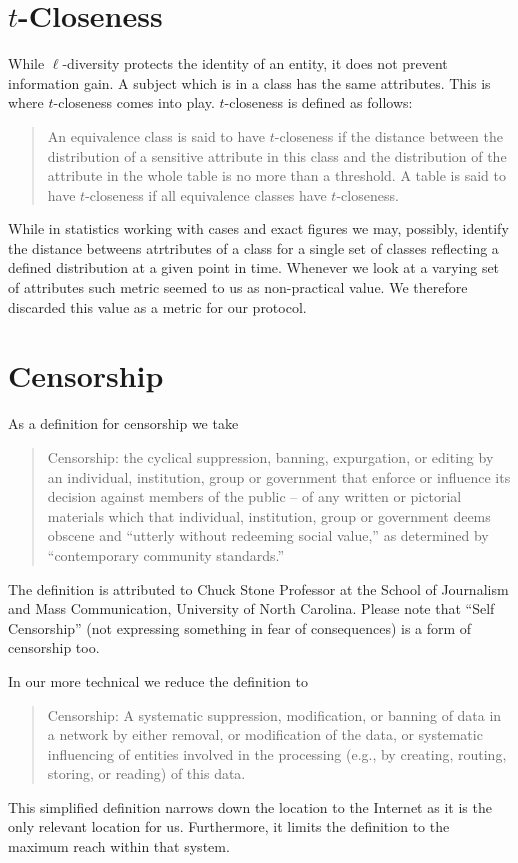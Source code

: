 \section{\texorpdfstring{$t$}{t}-Closeness}
While $\ell$-diversity protects the identity of an entity, it does not prevent information gain. A subject which is in a class has the same attributes. This is where $t$-closeness\cite{li2007t} comes into play. $t$-closeness is defined as follows:

\begin{quote}
	An equivalence class is said to have $t$-closeness if the distance between the distribution of a sensitive attribute in this class and the distribution of the attribute in the whole table is no more than a threshold. A table is said to have $t$-closeness if all equivalence classes have $t$-closeness.
\end{quote}

While in statistics working with cases and exact figures we may, possibly, identify the distance betweens atrtributes of a class for a single set of classes reflecting a defined distribution at a given point in time. Whenever we look at a varying set of attributes such metric seemed to us as non-practical value. We therefore discarded this value as a metric for our protocol.

\section{Censorship}
As a definition for censorship we take
\begin{quote}
	Censorship: the cyclical suppression, banning, expurgation, or editing by an individual, institution, group or government that enforce or influence its decision against members of the public -- of any written or pictorial materials which that individual, institution, group or government deems obscene and ``utterly without redeeming social value,'' as determined by ``contemporary community standards.''
\end{quote}

The definition is attributed to Chuck Stone Professor at the School of Journalism and Mass Communication, University of North Carolina. Please note that ``Self Censorship'' (not expressing something in fear of consequences) is a form of censorship too.

In our more technical we reduce the definition to
\begin{quote}
	Censorship: A systematic suppression, modification, or banning of data in a network by either removal, or modification of the data, or systematic influencing of entities involved in the processing (e.g., by creating, routing, storing, or reading) of this data.
\end{quote}
This simplified definition narrows down the location to the Internet as it is the only relevant location for us.  Furthermore, it limits the definition to the maximum reach within that system.


